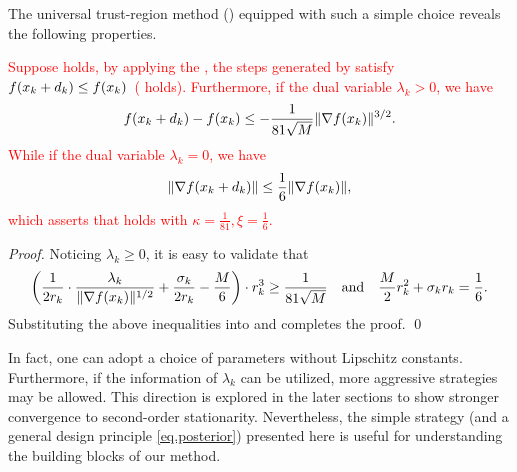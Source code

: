 The universal trust-region method () equipped with such a simple choice reveals the following properties.
\begin{corollary}\label{cor.conceptual descending}
    \textcolor{red}{
    Suppose  holds, by applying the , the steps generated by  satisfy
    $f(x_k+d_k) \le f(x_k)$~( holds).
    Furthermore, \textcolor{red}{if the dual variable $\lambda_k > 0$}, we have
    \begin{equation}\label{eq.func decrease conceptual fix}
        f(x_k+d_k) - f(x_k) \le -\frac{1}{81\sqrt{M}}\|\nabla f(x_k)\|^{3/2}.
    \end{equation}
    While if the dual variable $\lambda_k = 0$, we have
    \begin{equation}\label{eq.gradient norm conceptual fix}
        \|\nabla f(x_k+d_k)\| \le \frac{1}{6}\|\nabla f(x_k)\|,
    \end{equation}
    which asserts that  holds with $\kappa=\frac{1}{81},\xi = \frac{1}{6}$.}
\end{corollary}
\begin{proof}
Noticing $\lambda_k \ge 0$,  it is easy to validate that
    \begin{equation}
        \left (\frac{1}{2r_k} \cdot \frac{\lambda_k}{\|\nabla f(x_k)\|^{1/2}} + \frac{\sigma_k}{2r_k} - \frac{M}{6}\right)\cdot r_k^3 \ge \frac{1}{81\sqrt{M}} \quad \text{and} \quad \frac{M}{2} r_k^2 + \sigma_k r_k = \frac{1}{6}. \notag
    \end{equation}
    Substituting the above inequalities into  and  completes the proof.
\smartqed \qed \end{proof}
In fact, one can adopt a choice of parameters
without Lipschitz constants. Furthermore, if the information of $\lambda_k$ can be utilized, more aggressive strategies may be allowed. This direction is explored in the later sections to show stronger convergence to second-order stationarity. Nevertheless, the simple strategy (and a general design principle \eqref{eq.posterior}) presented here is useful for understanding the building blocks of our method.


